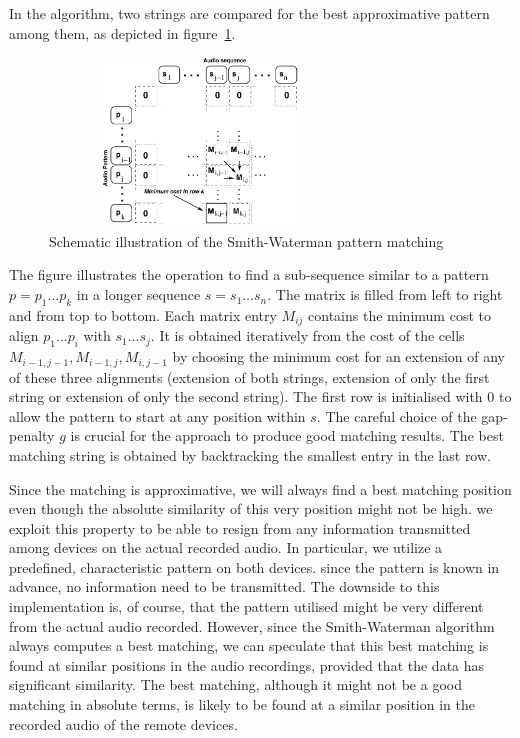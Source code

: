 \documentclass{sigchi}
\begin{document}
In the algorithm, two strings are compared for the best approximative pattern among them, as depicted in figure~\ref{figurePatternMatching}.
\begin{figure}
      \includegraphics[width=8cm, height=4.5cm]{AlignmentScheme_120130_v7_STS.pdf}
     \caption{Schematic illustration of the Smith-Waterman pattern matching}
     \label{figurePatternMatching}
\end{figure}
The figure illustrates the operation to find a sub-sequence similar to a pattern $p=p_1\dots p_k$ in a longer sequence $s=s_1\dots s_n$.
The matrix is filled from left to right and from top to bottom.
Each matrix entry $M_{ij}$ contains the minimum cost to align $p_1\dots p_i$ with $s_1\dots s_j$.
It is obtained iteratively from the cost of the cells $M_{i-1,j-1},M_{i-1,j},M_{i,j-1}$ by choosing the minimum cost for an extension of any of these three alignments (extension of both strings, extension of only the first string or extension of only the second string).
The first row is initialised with $0$ to allow the pattern to start at any position within $s$.
The careful choice of the gap-penalty $g$ is crucial for the approach to produce good matching results.
The best matching string is obtained by backtracking the smallest entry in the last row.

Since the matching is approximative, we will always find a best matching position even though the absolute similarity of this very position might not be high.
we exploit this property to be able to resign from any information transmitted among devices on the actual recorded audio.
In particular, we utilize a predefined, characteristic pattern on both devices.
since the pattern is known in advance, no information need to be transmitted.
The downside to this implementation is, of course, that the pattern utilised might be very different from the actual audio recorded.
However, since the Smith-Waterman algorithm always computes a best matching, we can speculate that this best matching is found at similar positions in the audio recordings, provided that the data has significant similarity.
The best matching, although it might not be a good matching in absolute terms, is likely to be found at a similar position in the recorded audio of the remote devices.
\end{document}
